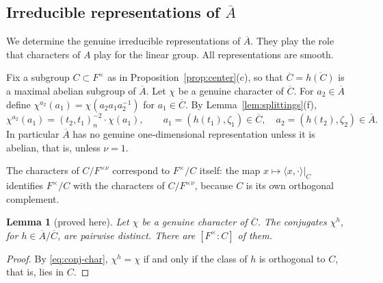 \documentclass[12pt,letterpaper]{article}
\numberwithin{equation}{section}
\newtheorem{lemma}[theorem]{Lemma}
\theoremstyle{definition}
\newcommand{\proved}{proved here}
\newcommand{\bA}{\overline{A}}
\newcommand{\bC}{\overline{C}}
\begin{document}
\subsection{\texorpdfstring{Irreducible representations of $\bA$}{Irreducible representations of A}}\label{subsec:torus-reps}

We determine the genuine irreducible representations of $\bA$.  They play the role that
characters of $A$ play for the linear group.  All representations are smooth.

Fix a subgroup $C\subset F^\times$ as in Proposition~\ref{prop:center}(c), so that
$\bC=\overline{h(C)}$ is a maximal abelian subgroup of $\bA$.  Let $\chi$ be a genuine
character of $\bC$.  For $a_2\in\bA$ define $\chi^{a_2}(a_1)=\chi(a_2a_1a_2^{-1})$ for
$a_1\in\bC$.  By Lemma~\ref{lem:splittings}(f),
\begin{equation}\label{eq:conj-char}
\chi^{a_2}(a_1)=(t_2,t_1)_n^{-2}\cdot\chi(a_1),\qquad
a_1=(h(t_1),\zeta_1)\in\bC,\quad a_2=(h(t_2),\zeta_2)\in\bA .
\end{equation}
In particular $\bA$ has no genuine one-dimensional representation unless it is abelian,
that is, unless $\nu=1$.

The characters of $C/F^{\times\nu}$ correspond to $F^\times/C$ itself: the map
$x\mapsto\langle x,\cdot\rangle|_C$ identifies $F^\times/C$ with the characters of
$C/F^{\times\nu}$, because $C$ is its own orthogonal complement.

\begin{lemma}[\proved]\label{lem:conjugates}
Let $\chi$ be a genuine character of $\bC$.  The conjugates $\chi^h$, for
$h\in\bA/\bC$, are pairwise distinct.  There are $[F^\times:C]$ of them.
\end{lemma}
\begin{proof}
By \eqref{eq:conj-char}, $\chi^{h}=\chi$ if and only if the class of $h$ is orthogonal to
$C$, that is, lies in $C$.
\end{proof}
\end{document}
